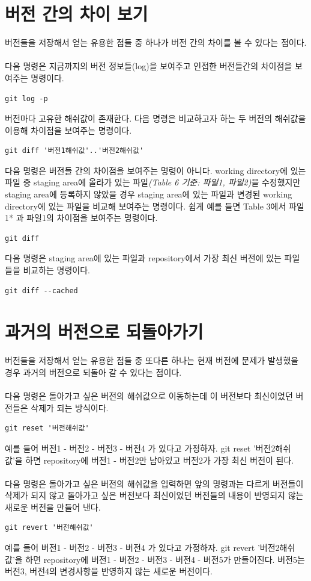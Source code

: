 \documentclass[letterpaper,12pt]{article}
\begin{document}
\section{버전 간의 차이 보기}
버전들을 저장해서 얻는 유용한 점들 중 하나가 버전 간의 차이를 볼 수 있다는 점이다.
\\\\ 다음 명령은 지금까지의 버전 정보들(log)을 보여주고 인접한 버전들간의 차이점을 보여주는 명령이다.
\begin{verbatim}
git log -p
\end{verbatim}
버전마다 고유한 해쉬값이 존재한다. 다음 명령은 비교하고자 하는 두 버전의 해쉬값을 이용해 차이점을 보여주는 명령이다. 
\begin{verbatim}
git diff '버전1해쉬값'..'버전2해쉬값'
\end{verbatim}
다음 명령은 버전들 간의 차이점을 보여주는 명령이 아니다. working directory에 있는 파일 중 staging area에 올라가 있는 파일\textit{(Table 6 기준: 파일1, 파일2)}을 수정했지만 staging area에 등록하지 않았을 경우 staging area에 있는 파일과 변경된 working directory에 있는 파일을 비교해 보여주는 명령이다. 쉽게 예를 들면 Table 3에서 파일1* 과 파일1의 차이점을 보여주는 명령이다.
\begin{verbatim}
git diff
\end{verbatim}
다음 명령은 staging area에 있는 파일과 repository에서 가장 최신 버전에 있는 파일들을 비교하는 명령이다.
\begin{verbatim}
git diff --cached
\end{verbatim}


\section{과거의 버전으로 되돌아가기}
버전들을 저장해서 얻는 유용한 점들 중 또다른 하나는 현재 버전에 문제가 발생했을 경우 과거의 버전으로 되돌아 갈 수 있다는 점이다.
\\\\다음 명령은 돌아가고 싶은 버전의 해쉬값으로 이동하는데 이 버전보다 최신이었던 버전들은 삭제가 되는 방식이다.
\begin{verbatim}
git reset '버전해쉬값'
\end{verbatim}
예를 들어 버전1 - 버전2 - 버전3 - 버전4 가 있다고 가정하자. git reset '버전2해쉬값'을 하면 repository에 버전1 - 버전2만 남아있고 버전2가 가장 최신 버전이 된다.
\\\\
다음 명령은 돌아가고 싶은 버전의 해쉬값을 입력하면 앞의 명령과는 다르게 버전들이 삭제가 되지 않고 돌아가고 싶은 버전보다 최신이었던 버전들의 내용이 반영되지 않는 새로운 버전을 만들어 낸다.  
\begin{verbatim}
git revert '버전해쉬값'
\end{verbatim}
예를 들어 버전1 - 버전2 - 버전3 - 버전4 가 있다고 가정하자. git revert '버전2해쉬값'을 하면 repository에 버전1 - 버전2 - 버전3 - 버전4 - 버전5가 만들어진다. 버전5는 버전3, 버전4의 변경사항을 반영하지 않는 새로운 버전이다.
\end{document}
